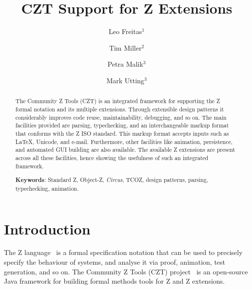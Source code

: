 \documentclass{llncs}
\newcommand{\Circus}{{\sf\slshape Circus}}
\begin{document}
\title{CZT Support for Z Extensions}
\author{Leo Freitas$^1$ \and Tim Miller$^2$ \and Petra Malik$^3$ \and Mark Utting$^3$}


\maketitle


\begin{abstract}
  The Community Z Tools (CZT) is an integrated framework for supporting the Z formal notation
  and its multiple extensions. Through extensible design patterns it considerably improves
  code reuse, maintainability, debugging, and so on.
  The main facilities provided are parsing, typechecking, and an interchangeable markup format
  that conforms with the Z ISO standard. This markup format accepts inputs such as \LaTeX,
  Unicode, and e-mail. Furthermore, other facilities like animation, persistence, and automated
  GUI building are also available.
  The available Z extensions are present across all these facilities, hence showing the
  usefulness of such an integrated framework.

  \noindent
  \textbf{Keywords}: Standard Z, Object-Z, \Circus, TCOZ, design patterns, parsing, typechecking, animation.

\end{abstract}

\section{Introduction} \label{sec:intro}

  The Z language~\cite{isoz} is a formal specification notation that
  can be used to precisely specify the behaviour of systems, and
  analyse it via proof, animation, test generation, and so on.  The Community
  Z Tools (CZT) project~\cite{czt} is an open-source Java framework
  for building formal methods tools for Z and Z extensions.
\end{document}
